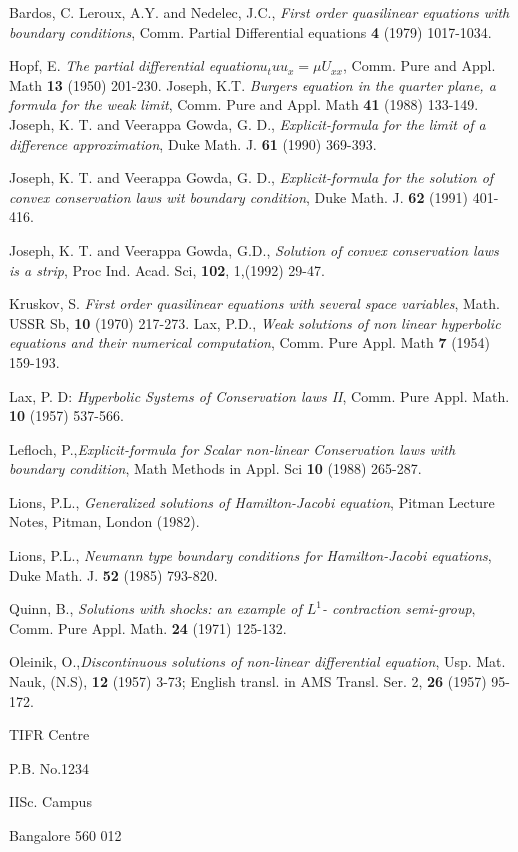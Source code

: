 \begin{thebibliography}{99}
 Bardos, C. Leroux, A.Y. and Nedelec, J.C., \textit{First order quasilinear equations with boundary conditions}, Comm. Partial Differential equations {\bf 4} (1979) 1017-1034.

 Hopf, E. \textit{The partial differential equation}$ u_{t}uu_{x}=\mu U_{xx}$, Comm. Pure and Appl. Math {\bf 13} (1950) 201-230.
 Joseph, K.T. \textit{Burgers equation in the quarter plane, a formula for the weak limit}, Comm. Pure and Appl. Math {\bf 41} (1988) 133-149.
 Joseph, K. T. and Veerappa Gowda, G. D., \textit{Explicit-formula for the limit of a difference approximation}, Duke Math. J. {\bf 61} (1990) 369-393.

 Joseph, K. T. and Veerappa Gowda, G. D., \textit{Explicit-formula for the solution of convex conservation laws wit boundary condition}, Duke Math. J. {\bf 62} (1991) 401-416.

 Joseph, K. T. and Veerappa Gowda, G.D., \textit{Solution of convex conservation laws is a strip}, Proc Ind. Acad. Sci, {\bf 102}, 1,(1992) 29-47.

 Kruskov, S. \textit{First order quasilinear equations with several space variables}, Math. USSR Sb,
 {\bf 10} (1970) 217-273.
 Lax, P.D., \textit{Weak solutions of non linear hyperbolic equations and their numerical computation}, Comm. Pure Appl. Math {\bf 7} (1954) 159-193.

 Lax, P. D: \textit{Hyperbolic Systems of Conservation laws II}, Comm. Pure Appl. Math. {\bf 10} (1957) 537-566.
 
 Lefloch, P.,\textit{Explicit-formula for Scalar non-linear Conservation laws with boundary condition}, Math Methods in Appl. Sci {\bf 10} (1988) 265-287.

 Lions, P.L., \textit{Generalized solutions of Hamilton-Jacobi equation}, Pitman Lecture Notes, Pitman, London (1982).

 Lions, P.L., \textit{Neumann type boundary conditions for Hamilton-Jacobi equations}, Duke Math. J.
{\bf 52} (1985) 793-820.

 Quinn, B., \textit{Solutions with shocks: an example of $L^{1}$- contraction semi-group}, Comm. Pure Appl. Math. {\bf 24} (1971) 125-132.

 Oleinik, O.,\textit{Discontinuous solutions of non-linear differential equation}, Usp. Mat. Nauk, (N.S), {\bf 12} (1957) 3-73; English transl. in AMS Transl. Ser. 2, {\bf 26} (1957) 95-172.
\end{thebibliography}

\begin{flushleft}
TIFR Centre

P.B. No.1234

IISc. Campus

Bangalore 560 012
\end{flushleft}
